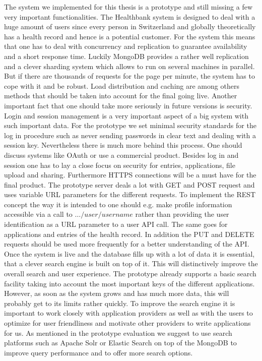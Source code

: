 The system we implemented for this thesis is a prototype and still missing a few very important functionalities. The Healthbank system is designed to deal with a huge amount of users since every person in Switzerland and globally theoretically has a health record and hence is a potential customer. For the system this means that one has to deal with concurrency and replication to guarantee availability and a short response time. Luckily MongoDB provides a rather well replication and a clever sharding system which allows to run on several machines in parallel. But if there are thousands of requests for the page per minute, the system has to cope with it and be robust. Load distribution and caching are among others methods that should be taken into account for the final going live. 
\newline
Another important fact that one should take more seriously in future versions is security. Login and session management is a very important aspect of a big system with such important data. For the prototype we set minimal security standards for the log in procedure such as never sending passwords in clear text and dealing with a session key. Nevertheless there is much more behind this process. One should discuss systems like OAuth or use a commercial product. Besides log in and session one has to lay a close focus on security for entries, applications, file upload and sharing. Furthermore HTTPS connections will be a must have for the final product.
\newline
The prototype server deals a lot with GET and POST request and uses variable URL parameters for the different requests. To implement the REST concept the way it is intended to one should e.g. make profile information accessible via a call to $\ldots/user/username$ rather than providing the user identification as a URL parameter to a user API call. The same goes for applications and entries of the health record. In addition the PUT and DELETE requests should be used more frequently for a better understanding of the API.
\newline
Once the system is live and the database fills up with a lot of data it is essential, that a clever search engine is built on top of it. This will distinctively improve the overall search and user experience. The prototype already supports a basic search facility taking into account the most important keys of the different applications. However, as soon as the system grows and has much more data, this will probably get to its limits rather quickly. To improve the search engine it is important to work closely with application providers as well as with the users to optimize for user friendliness and motivate other providers to write applications for us. As mentioned in the prototype evaluation we suggest to use search platforms such as Apache Solr or Elastic Search on top of the MongoDB to improve query performance and to offer more search options.
